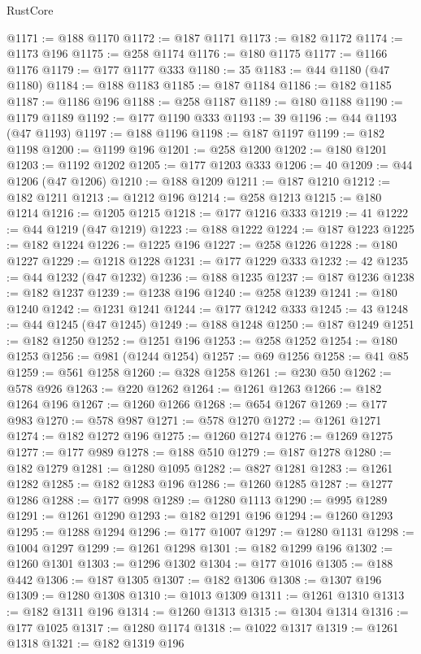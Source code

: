 \begin{lexlean}{RustCore}
\begin{coremodule}
@1171 := @188 @1170
@1172 := @187 @1171
@1173 := @182 @1172
@1174 := @1173 @196
@1175 := @258 @1174
@1176 := @180 @1175
@1177 := @1166 @1176
@1179 := @177 @1177 @333
@1180 := 35
@1183 := @44 @1180 (@47 @1180)
@1184 := @188 @1183
@1185 := @187 @1184
@1186 := @182 @1185
@1187 := @1186 @196
@1188 := @258 @1187
@1189 := @180 @1188
@1190 := @1179 @1189
@1192 := @177 @1190 @333
@1193 := 39
@1196 := @44 @1193 (@47 @1193)
@1197 := @188 @1196
@1198 := @187 @1197
@1199 := @182 @1198
@1200 := @1199 @196
@1201 := @258 @1200
@1202 := @180 @1201
@1203 := @1192 @1202
@1205 := @177 @1203 @333
@1206 := 40
@1209 := @44 @1206 (@47 @1206)
@1210 := @188 @1209
@1211 := @187 @1210
@1212 := @182 @1211
@1213 := @1212 @196
@1214 := @258 @1213
@1215 := @180 @1214
@1216 := @1205 @1215
@1218 := @177 @1216 @333
@1219 := 41
@1222 := @44 @1219 (@47 @1219)
@1223 := @188 @1222
@1224 := @187 @1223
@1225 := @182 @1224
@1226 := @1225 @196
@1227 := @258 @1226
@1228 := @180 @1227
@1229 := @1218 @1228
@1231 := @177 @1229 @333
@1232 := 42
@1235 := @44 @1232 (@47 @1232)
@1236 := @188 @1235
@1237 := @187 @1236
@1238 := @182 @1237
@1239 := @1238 @196
@1240 := @258 @1239
@1241 := @180 @1240
@1242 := @1231 @1241
@1244 := @177 @1242 @333
@1245 := 43
@1248 := @44 @1245 (@47 @1245)
@1249 := @188 @1248
@1250 := @187 @1249
@1251 := @182 @1250
@1252 := @1251 @196
@1253 := @258 @1252
@1254 := @180 @1253
@1256 := @981 (@1244 @1254)
@1257 := @69 @1256
@1258 := @41 @85
@1259 := @561 @1258
@1260 := @328 @1258
@1261 := @230 @50
@1262 := @578 @926
@1263 := @220 @1262
@1264 := @1261 @1263
@1266 := @182 @1264 @196
@1267 := @1260 @1266
@1268 := @654 @1267
@1269 := @177 @983
@1270 := @578 @987
@1271 := @578 @1270
@1272 := @1261 @1271
@1274 := @182 @1272 @196
@1275 := @1260 @1274
@1276 := @1269 @1275
@1277 := @177 @989
@1278 := @188 @510
@1279 := @187 @1278
@1280 := @182 @1279
@1281 := @1280 @1095
@1282 := @827 @1281
@1283 := @1261 @1282
@1285 := @182 @1283 @196
@1286 := @1260 @1285
@1287 := @1277 @1286
@1288 := @177 @998
@1289 := @1280 @1113
@1290 := @995 @1289
@1291 := @1261 @1290
@1293 := @182 @1291 @196
@1294 := @1260 @1293
@1295 := @1288 @1294
@1296 := @177 @1007
@1297 := @1280 @1131
@1298 := @1004 @1297
@1299 := @1261 @1298
@1301 := @182 @1299 @196
@1302 := @1260 @1301
@1303 := @1296 @1302
@1304 := @177 @1016
@1305 := @188 @442
@1306 := @187 @1305
@1307 := @182 @1306
@1308 := @1307 @196
@1309 := @1280 @1308
@1310 := @1013 @1309
@1311 := @1261 @1310
@1313 := @182 @1311 @196
@1314 := @1260 @1313
@1315 := @1304 @1314
@1316 := @177 @1025
@1317 := @1280 @1174
@1318 := @1022 @1317
@1319 := @1261 @1318
@1321 := @182 @1319 @196

\end{coremodule}
\end{lexlean}
